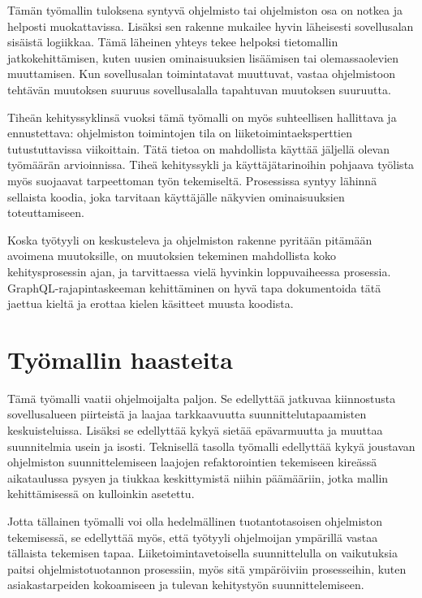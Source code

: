Tämän työmallin tuloksena syntyvä ohjelmisto tai ohjelmiston osa on
notkea ja helposti muokattavissa. Lisäksi sen rakenne mukailee hyvin
läheisesti sovellusalan sisäistä logiikkaa. Tämä läheinen yhteys tekee
helpoksi tietomallin jatkokehittämisen, kuten uusien ominaisuuksien
lisäämisen tai olemassaolevien muuttamisen. Kun sovellusalan
toimintatavat muuttuvat, vastaa ohjelmistoon tehtävän muutoksen suuruus
sovellusalalla tapahtuvan muutoksen suuruutta.

Tiheän kehityssyklinsä vuoksi tämä työmalli on myös suhteellisen
hallittava ja ennustettava: ohjelmiston toimintojen tila on
liiketoimintaeksperttien tutustuttavissa viikoittain. Tätä tietoa on
mahdollista käyttää jäljellä olevan työmäärän arvioinnissa. Tiheä
kehityssykli ja käyttäjätarinoihin pohjaava työlista myös suojaavat
tarpeettoman työn tekemiseltä. Prosessissa syntyy lähinnä sellaista
koodia, joka tarvitaan käyttäjälle näkyvien ominaisuuksien
toteuttamiseen.

Koska työtyyli on keskusteleva ja ohjelmiston rakenne pyritään pitämään
avoimena muutoksille, on muutoksien tekeminen mahdollista koko
kehitysprosessin ajan, ja tarvittaessa vielä hyvinkin loppuvaiheessa
prosessia. GraphQL-rajapintaskeeman kehittäminen on hyvä tapa
dokumentoida tätä jaettua kieltä ja erottaa kielen käsitteet muusta
koodista.

\hypertarget{tyuxf6mallin-haasteita}{%
\section{Työmallin haasteita}\label{tyuxf6mallin-haasteita}}

Tämä työmalli vaatii ohjelmoijalta paljon. Se edellyttää jatkuvaa
kiinnostusta sovellusalueen piirteistä ja laajaa tarkkaavuutta
suunnittelutapaamisten keskuisteluissa. Lisäksi se edellyttää kykyä
sietää epävarmuutta ja muuttaa suunnitelmia usein ja isosti. Teknisellä
tasolla työmalli edellyttää kykyä joustavan ohjelmiston
suunnittelemiseen laajojen refaktorointien tekemiseen kireässä
aikataulussa pysyen ja tiukkaa keskittymistä niihin päämääriin, jotka
mallin kehittämisessä on kulloinkin asetettu.

Jotta tällainen työmalli voi olla hedelmällinen tuotantotasoisen
ohjelmiston tekemisessä, se edellyttää myös, että työtyyli ohjelmoijan
ympärillä vastaa tällaista tekemisen tapaa. Liiketoimintavetoisella
suunnittelulla on vaikutuksia paitsi ohjelmistotuotannon prosessiin,
myös sitä ympäröiviin prosesseihin, kuten asiakastarpeiden kokoamiseen
ja tulevan kehitystyön suunnittelemiseen.

